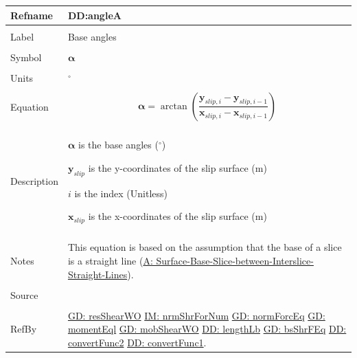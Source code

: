 \documentclass[12pt]{article}
\begin{document}
\noindent \begin{minipage}{\textwidth}
\begin{tabular}{p{} p{}}
\toprule \textbf{Refname} & \textbf{DD:angleA}
\label{DD:angleA}
\\ \midrule \\
Label & Base angles
\\ \midrule \\
Symbol & $\mathbf{α}$
\\ \midrule \\
Units & ${}^{\circ}$
\\ \midrule \\
Equation & \begin{displaymath}
           \mathbf{α}=\arctan\left(\frac{{\mathbf{y}_{slip,i}}-{\mathbf{y}_{slip,i-1}}}{{\mathbf{x}_{slip,i}}-{\mathbf{x}_{slip,i-1}}}\right)
           \end{displaymath}
\\ \midrule \\
Description & \begin{symbDescription}
              \item{$\mathbf{α}$ is the base angles (${}^{\circ}$)}
              \item{${\mathbf{y}_{slip}}$ is the y-coordinates of the slip surface (m)}
              \item{$i$ is the index (Unitless)}
              \item{${\mathbf{x}_{slip}}$ is the x-coordinates of the slip surface (m)}
              \end{symbDescription}
\\ \midrule \\
Notes & This equation is based on the assumption that the base of a slice is a straight line (\hyperref[assumpSBSBISL]{A: Surface-Base-Slice-between-Interslice-Straight-Lines}).
\\ \midrule \\
Source & \cite{fredlund1977}
\\ \midrule \\
RefBy & \hyperref[GD:resShearWO]{GD: resShearWO} \hyperref[IM:nrmShrForNum]{IM: nrmShrForNum} \hyperref[GD:normForcEq]{GD: normForcEq} \hyperref[GD:momentEql]{GD: momentEql} \hyperref[GD:mobShearWO]{GD: mobShearWO} \hyperref[DD:lengthLb]{DD: lengthLb} \hyperref[GD:bsShrFEq]{GD: bsShrFEq} \hyperref[DD:convertFunc2]{DD: convertFunc2} \hyperref[DD:convertFunc1]{DD: convertFunc1}.
\\ \bottomrule \end{tabular}
\end{minipage}
\par~
\end{document}
